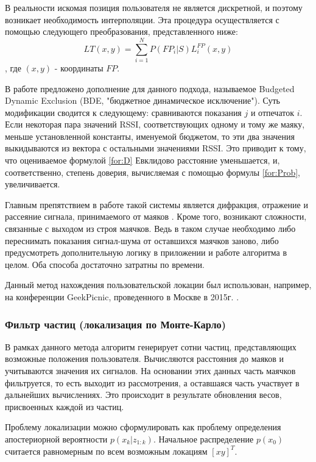 В реальности искомая позиция пользователя не является дискретной, и поэтому возникает необходимость интерполяции. Эта процедура осуществляется с помощью следующего преобразования, представленного ниже:
\[
    LT(x,y) = \sum_{i=1}^N P(FP_i | S) L_i^{FP}(x,y)
\]
, где $(x,y)$ - координаты $FP$.

В работе \cite{elbes2013precise} предложено дополнение для данного подхода, называемое Budgeted Dynamic Exclusion (BDE, "бюджетное динамическое исключение"). Суть модификации сводится к следующему: сравниваются показания $j$ и отпечаток $i$. Если некоторая пара значений RSSI, соответствующих одному и тому же маяку, меньше установленной константы, именуемой бюджетом, то эти два значения выкидываются из вектора с остальными значениями RSSI. Это приводит к тому, что оцениваемое формулой \ref{for:D} Евклидово расстояние уменьшается, и, соответственно, степень доверия, вычисляемая с помощью формулы \ref{for:Prob}, увеличивается.

Главным препятствием в работе такой системы является дифракция, отражение и рассеяние сигнала, принимаемого от маяков \cite{liu2007survey}. Кроме того, возникают сложности, связанные с выходом из строя маячков. Ведь в таком случае необходимо либо переснимать показания сигнал-шума от оставшихся маячков заново, либо предусмотреть дополнительную логику в приложении и работе алгоритма в целом. Оба способа достаточно затратны по времени.

Данный метод нахождения пользовательской локации был использован, например, на конференции GeekPicnic, проведенного в Москве в 2015г. \cite{web:habrGeekPicknic}. 

\subsubsection{Фильтр частиц (локализация по Монте-Карло)}

В рамках данного метода алгоритм генерирует сотни частиц, представляющих возможные положения пользователя. Вычисляются расстояния до маяков и учитываются значения их сигналов. На основании этих данных часть маячков фильтруется, то есть выходит из рассмотрения, а оставшаяся часть участвует в дальнейших вычислениях. Это происходит в результате обновления весов, присвоенных каждой из частиц.

Проблему локализации можно сформулировать как проблему определения апостериорной вероятности  $p(x_k | z_{1:k})$. Начальное распределение $p(x_0)$ считается равномерным по всем возможным локациям $[x y]^T$.

